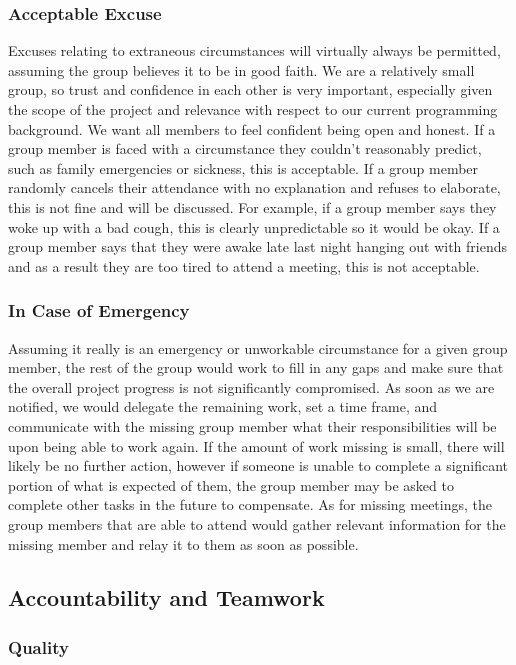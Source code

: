 \documentclass{article}
\begin{document}
\subsubsection*{Acceptable Excuse}

Excuses relating to extraneous circumstances will virtually always be permitted, assuming the group believes it to be in good faith. We are a relatively small group, so trust and confidence in each other is very important, especially given the scope of the project and relevance with respect to our current programming background. We want all members to feel confident being open and honest. If a group member is faced with a circumstance they couldn't reasonably predict, such as family emergencies or sickness, this is acceptable. If a group member randomly cancels their attendance with no explanation and refuses to elaborate, this is not fine and will be discussed. For example, if a group member says they woke up with a bad cough, this is clearly unpredictable so it would be okay. If a group member says that they were awake late last night hanging out with friends and as a result they are too tired to attend a meeting, this is not acceptable. 

\subsubsection*{In Case of Emergency}

Assuming it really is an emergency or unworkable circumstance for a given group member, the rest of the group would work to fill in any gaps and make sure that the overall project progress is not significantly compromised. As soon as we are notified, we would delegate the remaining work, set a time frame, and communicate with the missing group member what their responsibilities will be upon being able to work again. If the amount of work missing is small, there will likely be no further action, however if someone is unable to complete a significant portion of what is expected of them, the group member may be asked to complete other tasks in the future to compensate. As for missing meetings, the group members that are able to attend would gather relevant information for the missing member and relay it to them as soon as possible. 

\subsection*{Accountability and Teamwork}

\subsubsection*{Quality} 
\end{document}
